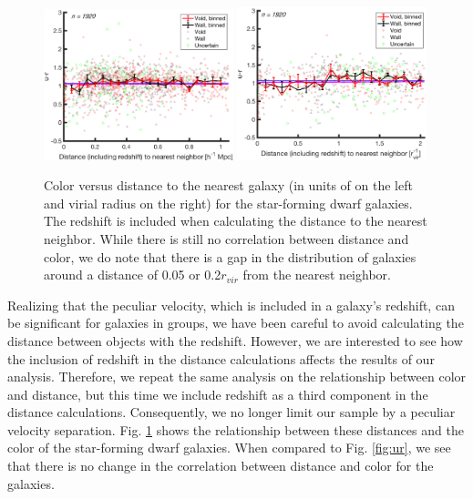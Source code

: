 \begin{figure}
    \includegraphics[width=0.49\textwidth]{Images/smallScaleEnvironment/1sig_dwarf_I06relations_zAbsDist_ur}
    \includegraphics[width=0.49\textwidth]{Images/smallScaleEnvironment/1sig_dwarf_I06relations_zVirDist_ur}
    \caption[Color versus distance calculated with redshift]{Color versus 
    distance to the nearest galaxy (in units of \hMpc on the left and virial 
    radius on the right) for the star-forming dwarf galaxies.  The redshift is 
    included when calculating the distance to the nearest neighbor.  While there 
    is still no correlation between distance and color, we do note that there is 
    a gap in the distribution of galaxies around a distance of 0.05 \hMpc or 
    0.2$r_{vir}$ from the nearest neighbor.}
    \label{fig:ur_xyz}
\end{figure}

Realizing that the peculiar velocity, which is included in a galaxy's redshift, 
can be significant for galaxies in groups, we have been careful to avoid 
calculating the distance between objects with the redshift.  However, we are 
interested to see how the inclusion of redshift in the distance calculations 
affects the results of our analysis.  Therefore, we repeat the same analysis on 
the relationship between color and distance, but this time we include redshift 
as a third component in the distance calculations.  Consequently, we no longer 
limit our sample by a peculiar velocity separation.  Fig. \ref{fig:ur_xyz} shows 
the relationship between these distances and the color of the star-forming dwarf 
galaxies.  When compared to Fig. \ref{fig:ur}, we see that there is no change in 
the correlation between distance and color for the galaxies.  

